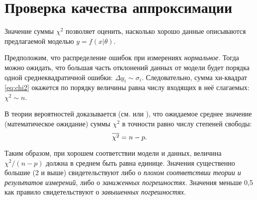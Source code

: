 \section{Проверка качества аппроксимации}

Значение суммы $\chi^2$ позволяет оценить, насколько хорошо данные описываются
предлагаемой моделью $y=f(x|\theta)$.

Предположим, что распределение ошибок при измерениях \emph{нормальное}.
Тогда можно ожидать, что большая часть отклонений данных от модели будет
порядка одной среднеквадратичной ошибки: $\Delta y_{i}\sim\sigma_{i}$.
Следовательно, сумма хи-квадрат \eqref{eq:chi2} окажется по порядку
величины равна числу входящих в неё слагаемых: $\chi^{2}\sim n$.


В теории вероятностей доказывается (см. \cite{hudson} или \cite{idie}),
что ожидаемое среднее значение (математическое ожидание) суммы $\chi^{2}$
в точности равно числу степеней свободы:
\[
\overline{\chi^{2}}=n-p.
\]

Таким образом, при хорошем соответствии модели и данных,
величина $\chi^2 / (n-p) $ должна в среднем быть равна единице.
Значения существенно большие (2 и выше) свидетельствуют либо о
\emph{плохом соответствии теории и результатов измерений},
    либо о \emph{заниженных погрешностях}.
    Значения меньше 0,5 как правило свидетельствуют о \emph{завышенных погрешностях}.


